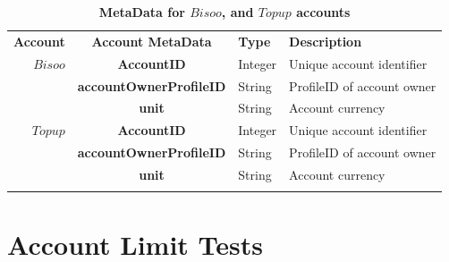 \begin{table}[H]
\begin{centering}
\small
{
\begin{tabular}{ r | c | l | l }
\textbf{Account}	& {\bf Account MetaData} & {\bf Type} & {\bf Description} \\
\Xhline{1.5pt}
$Bisoo$ 		& {\bf AccountID}			&Integer	& Unique account identifier \\
			& {\bf accountOwnerProfileID}	&String	& ProfileID of account owner \\
			& {\bf unit}					&String	& Account currency \\
\Xhline{1.5pt}
$Topup$ 		& {\bf AccountID}			&Integer	& Unique account identifier \\
			& {\bf accountOwnerProfileID}	&String	& ProfileID of account owner \\
			& {\bf unit}					&String	& Account currency \\
\Xhline{1.5pt}
\end{tabular}
}
\caption{\small\textbf{MetaData for $Bisoo$, and $Topup$ accounts}}
\label{tab:AccountMetaData2}
\end{centering}
\end{table}















\section{Account Limit Tests}











